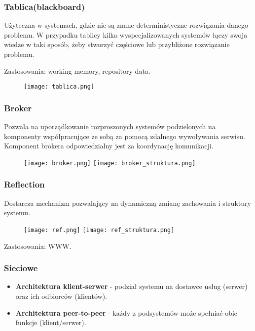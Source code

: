 \documentclass[../main.tex]{subfiles}
\begin{document}
    \subsubsection{Tablica(blackboard)}
    Użyteczna w systemach, gdzie nie są znane deterministyczne rozwiązania danego problemu. W przypadku tablicy kilka wyspecjalizowanych
    systemów łączy swoja wiedze w taki sposób, żeby stworzyć częściowe lub przybliżone rozwiązanie problemu.

    Zastosowania: working memory, repository data.

    \begin{figure}[h]
        \texttt{[image: tablica.png]}
    \end{figure}



    \subsubsection{Broker}
    Pozwala na uporządkowanie rozproszonych systemów podzielonych na komponenty współpracujące ze sobą za pomocą zdalnego wywoływania
    serwisu. Komponent brokera odpowiedzialny jest za koordynację komunikacji.

    \begin{figure}[h]
        \texttt{[image: broker.png]}
        \texttt{[image: broker\_struktura.png]}
    \end{figure}

    \subsubsection{Reflection}
    Dostarcza mechanizm pozwalający na dynamiczną zmianę zachowania i struktury systemu.
    \begin{figure}[h]
        \texttt{[image: ref.png]}
        \texttt{[image: ref\_struktura.png]}
    \end{figure}

    Zastosowania: WWW.

    \subsubsection{Sieciowe}
    \begin{itemize}
        \item \textbf{Architektura klient-serwer} - podział systemu na dostawce usług (serwer) oraz ich odbiorców (klientów).
        \item \textbf{Architektura peer-to-peer} - każdy z podsystemów może spełniać obie funkcje (klient/serwer).

    \end{itemize}
\end{document}
